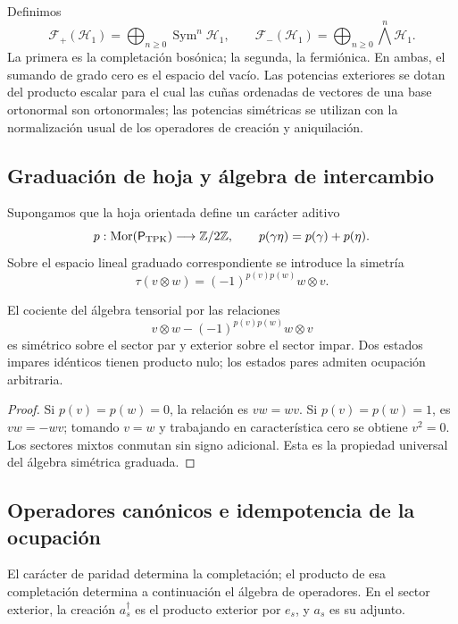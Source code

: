 Definimos
\[
 \mathcal F_+(\mathcal H_1)=
 \bigoplus_{n\geq0}\operatorname{Sym}^n\mathcal H_1,
 \qquad
 \mathcal F_-(\mathcal H_1)=
 \bigoplus_{n\geq0}\bigwedge^n\mathcal H_1.
\]
La primera es la completación bosónica; la segunda, la fermiónica. En ambas,
el sumando de grado cero es el espacio del vacío. Las potencias exteriores
se dotan del producto escalar para el cual las cuñas ordenadas de vectores
de una base ortonormal son ortonormales; las potencias simétricas se utilizan
con la normalización usual de los operadores de creación y aniquilación.

\subsection{Graduación de hoja y álgebra de intercambio}
\label{v:rec:completaciones:section:04}

Supongamos que la hoja orientada define un carácter aditivo
\[
 p:\operatorname{Mor}(\mathsf P_{\rm TPK})\longrightarrow\mathbb Z/2\mathbb Z,
 \qquad p(\gamma\eta)=p(\gamma)+p(\eta).
\]
Sobre el espacio lineal graduado correspondiente se introduce la simetría
\[
 \tau(v\otimes w)=(-1)^{p(v)p(w)}w\otimes v.
\]

\begin{theorem}
\label{v:rec:completaciones:statement:02}
El cociente del álgebra tensorial por las relaciones
\[
 v\otimes w-(-1)^{p(v)p(w)}w\otimes v
\]
es simétrico sobre el sector par y exterior sobre el sector impar. Dos estados
impares idénticos tienen producto nulo; los estados pares admiten ocupación
arbitraria.
\end{theorem}

\begin{proof}
Si \(p(v)=p(w)=0\), la relación es \(vw=wv\). Si
\(p(v)=p(w)=1\), es \(vw=-wv\); tomando \(v=w\) y trabajando en
característica cero se obtiene \(v^2=0\). Los sectores mixtos conmutan sin
signo adicional. Esta es la propiedad universal del álgebra simétrica
graduada.
\end{proof}

\subsection{Operadores canónicos e idempotencia de la ocupación}
\label{v:pauli:car-construccion}

El carácter de paridad determina la completación; el producto de esa
completación determina a continuación el álgebra de operadores. En el
sector exterior, la creación \(a_s^\dagger\) es el producto exterior por
\(e_s\), y \(a_s\) es su adjunto.

